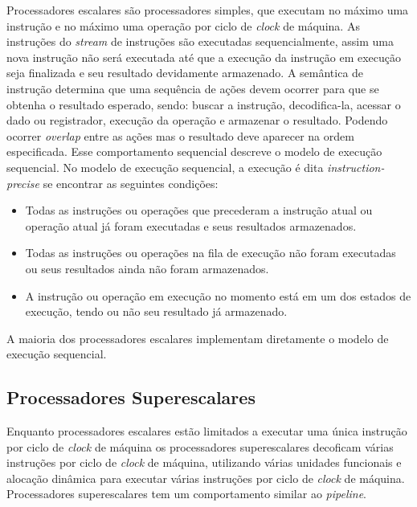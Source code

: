 Processadores escalares são processadores simples, que executam no 
máximo uma instrução e no máximo uma operação por ciclo de \textit{clock} de 
máquina. 
As instruções do \textit{stream} de instruções são executadas 
sequencialmente, assim uma nova instrução não será executada até que a execução 
da instrução em execução seja finalizada e seu resultado devidamente
armazenado.
A semântica de instrução determina que uma sequência de ações devem ocorrer
para que se obtenha o resultado esperado, sendo: buscar a instrução,
decodifica-la, acessar o dado ou registrador, execução da operação e armazenar o
resultado. 
Podendo ocorrer \textit{overlap} entre as ações mas o resultado deve
aparecer na ordem especificada.
Esse comportamento sequencial descreve o modelo de execução sequencial.
No modelo de execução sequencial, a execução é dita \textit{instruction-precise}
se encontrar as seguintes condições:

\begin{itemize}
        \item Todas as instruções ou operações que precederam a instrução atual
                ou operação atual já foram executadas e seus resultados
                armazenados.
        \item Todas as instruções ou operações na fila de execução não foram
                executadas ou seus resultados ainda não foram armazenados.
        \item A instrução ou operação em execução no momento está em um dos
                estados de execução, tendo ou não seu resultado já armazenado.
\end{itemize}

A maioria dos processadores escalares implementam diretamente o modelo de
execução sequencial.


\subsection{Processadores Superescalares}

Enquanto processadores escalares estão limitados a executar uma única instrução 
por ciclo de \textit{clock} de máquina os processadores superescalares decoficam
várias instruções por ciclo de \textit{clock} de máquina, utilizando várias
unidades funcionais e alocação dinâmica para executar várias instruções por
ciclo de \textit{clock} de máquina. 
Processadores superescalares tem um comportamento similar ao \textit{pipeline}.

